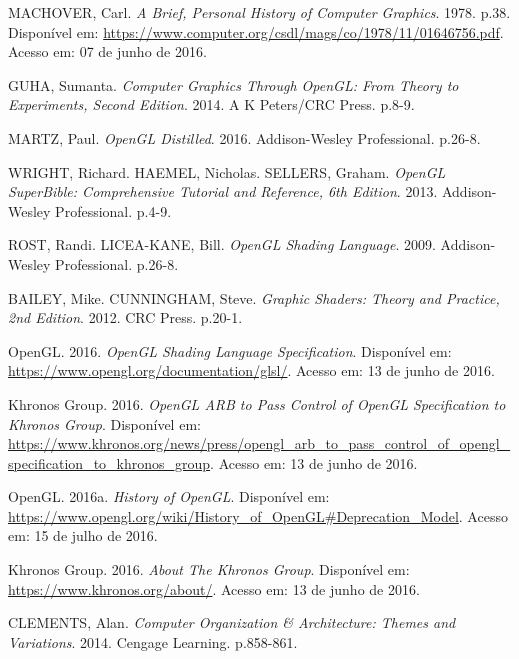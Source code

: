 \documentclass[brazil,ruledheader]{abntifes}
\begin{document}
\begin{thebibliography}{9}

MACHOVER, Carl. \textit{A Brief, Personal History of Computer Graphics}. 1978. p.38. Disponível em: \url{https://www.computer.org/csdl/mags/co/1978/11/01646756.pdf}.
Acesso em: 07 de junho de 2016.

GUHA, Sumanta. \textit{Computer Graphics Through OpenGL: From Theory to Experiments, Second Edition}. 2014. A K Peters/CRC Press. p.8-9.

MARTZ, Paul. \textit{OpenGL Distilled}. 2016. Addison-Wesley Professional. p.26-8.

WRIGHT, Richard. HAEMEL, Nicholas. SELLERS, Graham. \textit{OpenGL SuperBible: Comprehensive Tutorial and Reference, 6th Edition}. 2013. Addison-Wesley Professional. p.4-9.

ROST, Randi. LICEA-KANE, Bill. \textit{OpenGL Shading Language}. 2009. Addison-Wesley Professional. p.26-8.


BAILEY, Mike. CUNNINGHAM, Steve. \textit{Graphic Shaders: Theory and Practice, 2nd Edition}. 2012. CRC Press. p.20-1.

OpenGL. 2016. \textit{OpenGL Shading Language Specification}. Disponível em: \url{https://www.opengl.org/documentation/glsl/}.
Acesso em: 13 de junho de 2016.

Khronos Group. 2016. \textit{OpenGL ARB to Pass Control of OpenGL Specification to Khronos Group}. Disponível em: \url{https://www.khronos.org/news/press/opengl_arb_to_pass_control_of_opengl_specification_to_khronos_group}.
Acesso em: 13 de junho de 2016.

OpenGL. 2016a. \textit{History of OpenGL}. Disponível em: \url{https://www.opengl.org/wiki/History_of_OpenGL#Deprecation_Model}.
Acesso em: 15 de julho de 2016.

Khronos Group. 2016. \textit{About The Khronos Group}. Disponível em: \url{https://www.khronos.org/about/}.
Acesso em: 13 de junho de 2016.


CLEMENTS, Alan. \textit{Computer Organization \& Architecture: Themes and Variations}. 2014. Cengage Learning. p.858-861.


\end{thebibliography}
\end{document}
